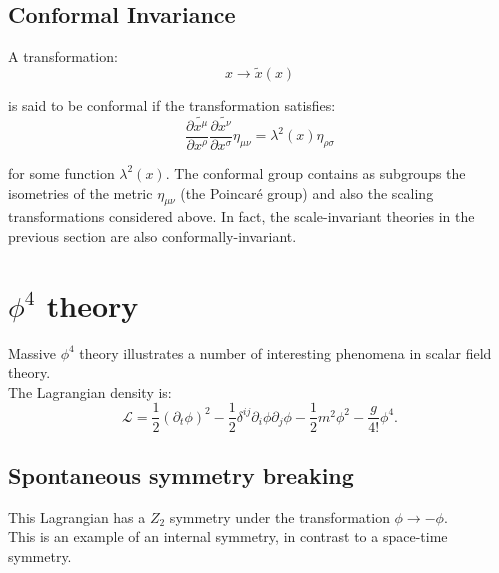 \subsection{Conformal Invariance}

A transformation:\\

\begin{equation}
    x\rightarrow \tilde{x}(x)
\end{equation}

is said to be conformal if the transformation satisfies:\\

\begin{equation}
    \frac{\partial\tilde{x^\mu}}{\partial x^\rho}\frac{\partial\tilde{x^\nu}}{\partial x^\sigma}\eta_{\mu\nu}=\lambda^2(x)\eta_{\rho\sigma}
\end{equation}

for some function $\lambda^2(x)$. The conformal group contains as subgroups the isometries of the metric $\eta_{\mu\nu}$ (the Poincaré group) and also the scaling transformations considered above. In fact, the scale-invariant theories in the previous section are also conformally-invariant.\\

\section{$\phi^4$ theory}

Massive $\phi^4$ theory illustrates a number of interesting phenomena in scalar field theory.\\

The Lagrangian density is:\\

\begin{equation}
    \mathcal{L}=\frac{1}{2}(\partial_t\phi)^2 -\frac{1}{2}\delta^{ij}\partial_i\phi\partial_j\phi - \frac{1}{2}m^2\phi^2-\frac{g}{4!}\phi^4.
\end{equation}

\subsection{Spontaneous symmetry breaking}

This Lagrangian has a $Z_2$ symmetry under the transformation $\phi\rightarrow-\phi$.\\

This is an example of an internal symmetry, in contrast to a space-time symmetry.\\

